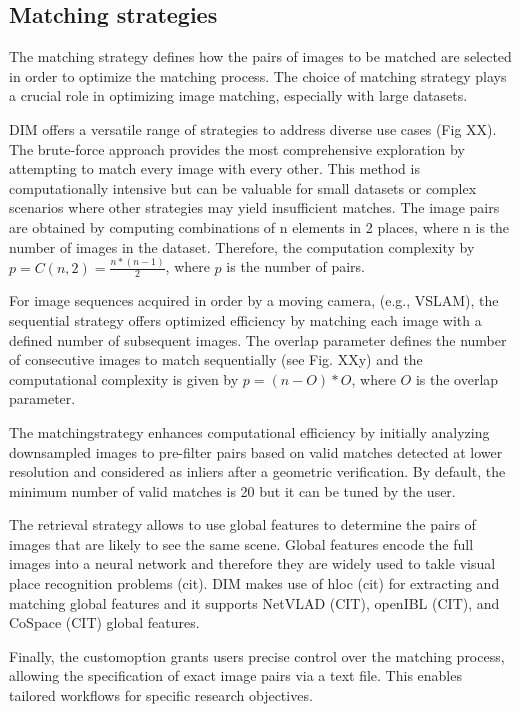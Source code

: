 \subsection{Matching strategies}

The matching strategy defines how the pairs of images to be matched are selected in order to optimize the matching process. The choice of matching strategy plays a crucial role in optimizing image matching, especially with large datasets.  

DIM offers a versatile range of strategies to address diverse use cases (Fig XX). The brute-force approach provides the most comprehensive exploration by attempting to match every image with every other. This method is computationally intensive but can be valuable for small datasets or complex scenarios where other strategies may yield insufficient matches. The image pairs are obtained by computing combinations of n elements in 2 places, where n is the number of images in the dataset. Therefore, the computation complexity by 
$ p = C(n,2) = \frac{n*\left(n-1\right)}{2}$, where $p$ is the number of pairs.

For image sequences acquired in order by a moving camera, (e.g., VSLAM), the sequential strategy offers optimized efficiency by matching each image with a defined number of subsequent images. The overlap parameter defines the number of consecutive images to match sequentially (see Fig. XXy) and the computational complexity is given by $p = \left(n-O\right) * O $, where $O$ is the overlap parameter.

The matching\textunderscorelowres strategy enhances computational efficiency by initially analyzing downsampled images to pre-filter pairs based on valid matches detected at lower resolution and considered as inliers after a geometric verification. By default, the minimum number of valid matches is 20 but it can be tuned by the user. 

The retrieval strategy allows to use global features to determine the pairs of images that are likely to see the same scene. Global features encode the full images into a neural network and therefore they are widely used to takle visual place recognition problems (cit). DIM makes use of hloc (cit) for extracting and matching global features and it supports NetVLAD (CIT), openIBL (CIT), and CoSpace (CIT) global features.  

Finally, the custom\textunderscorepairs option grants users precise control over the matching process, allowing the specification of exact image pairs via a text file. This enables tailored workflows for specific research objectives. 

